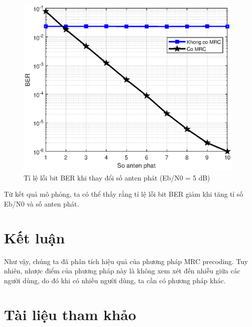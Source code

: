 \documentclass[conference]{IEEEtran}
\begin{document}
	\begin{figure}[h]
		\includegraphics[width=\linewidth]{Figures/Tx}
		\caption{Tỉ lệ lỗi bit BER khi thay đổi số anten phát (Eb/N0 = 5 dB) }
		\label{Tx}
	\end{figure}
	Từ kết quả mô phỏng, ta có thể thấy rằng tỉ lệ lỗi bit BER giảm khi tăng tỉ số Eb/N0 và số anten phát.
	\section{Kết luận}
	Như vậy, chúng ta đã phân tích hiệu quả của phương pháp MRC precoding. Tuy nhiên, nhược điểm của phương pháp này là không xem xét đến nhiễu giữa các người dùng, do đó khi có nhiều người dùng, ta cần có phương pháp khác.
	\section{Tài liệu tham khảo}
	
	 
\end{document}
